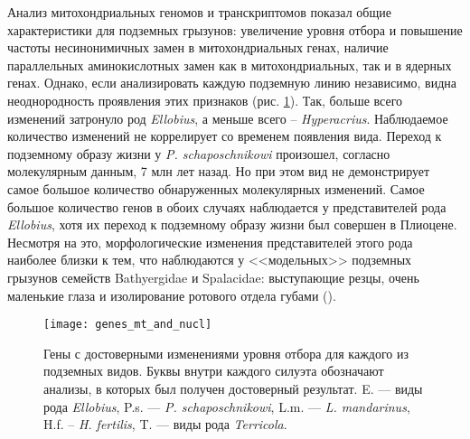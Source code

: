 Анализ митохондриальных геномов и транскриптомов показал общие характеристики для подземных грызунов: увеличение уровня отбора и повышение частоты несинонимичных замен в митохондриальных генах, наличие параллельных аминокислотных замен как в митохондриальных, так и в ядерных генах. Однако, если анализировать каждую подземную линию независимо, видна неоднородность проявления этих признаков (рис. \ref{Convergent_arv}). Так, больше всего изменений затронуло род \textit{Ellobius}, а меньше всего -- \textit{Hyperacrius}. Наблюдаемое количество изменений не коррелирует со временем появления вида. Переход к подземному образу жизни у \textit{P. schaposchnikowi} произошел, согласно молекулярным данным, 7 млн лет назад. Но при этом вид не демонстрирует самое большое количество обнаруженных молекулярных изменений. Самое большое количество генов в обоих случаях наблюдается у представителей рода \textit{Ellobius}, хотя их переход к подземному образу жизни был совершен в Плиоцене. Несмотря на это, морфологические изменения представителей этого рода наиболее близки к тем, что наблюдаются у <<модельных>> подземных грызунов семейств Bathyergidae и Spalacidae: выступающие резцы, очень маленькие глаза и изолирование ротового отдела губами (\cite{Gromov1977}). 

\begin{figure}[h!]
	\begin{center}
		\texttt{[image: genes\_mt\_and\_nucl]}
	\end{center}
	\caption{Гены с достоверными изменениями уровня отбора для каждого из подземных видов. Буквы внутри каждого силуэта обозначают анализы, в которых был получен достоверный результат. E. --- виды рода \textit{Ellobius}, P.s. --- \textit{P. schaposchnikowi}, L.m. --- \textit{L. mandarinus}, H.f. -- \textit{H. fertilis}, T. — виды рода \textit{Terricola}.} \label{Convergent_arv}
\end{figure}


